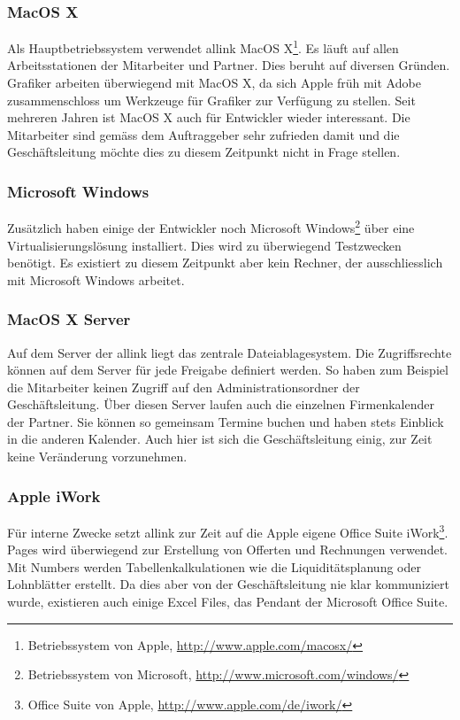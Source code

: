 \subsubsection{MacOS X}
Als Hauptbetriebssystem verwendet allink MacOS X\footnote{Betriebssystem von Apple, \url{http://www.apple.com/macosx/}}.
Es läuft auf allen Arbeitsstationen der Mitarbeiter und Partner. Dies beruht
auf diversen Gründen. Grafiker arbeiten überwiegend mit MacOS X, da sich Apple
früh mit Adobe zusammenschloss um Werkzeuge für Grafiker zur Verfügung zu stellen.
Seit mehreren Jahren ist MacOS X auch für Entwickler wieder interessant. Die 
Mitarbeiter sind gemäss dem Auftraggeber sehr zufrieden damit und die Geschäftsleitung 
möchte dies zu diesem Zeitpunkt nicht in Frage stellen.

\subsubsection{Microsoft Windows}
Zusätzlich haben einige der Entwickler noch Microsoft Windows\footnote{Betriebssystem von Microsoft, \url{http://www.microsoft.com/windows/}}
über eine Virtualisierungslösung installiert. Dies wird zu überwiegend Testzwecken 
benötigt. Es existiert zu diesem Zeitpunkt aber kein Rechner, der ausschliesslich
mit Microsoft Windows arbeitet.

\subsubsection{MacOS X Server}
Auf dem Server der allink liegt das zentrale Dateiablagesystem. Die Zugriffsrechte können
auf dem Server für jede Freigabe definiert werden. So haben zum Beispiel
die Mitarbeiter keinen Zugriff auf den Administrationsordner der Geschäftsleitung.
Über diesen Server laufen auch die einzelnen Firmenkalender der Partner. Sie
können so gemeinsam Termine buchen und haben stets Einblick in die anderen
Kalender. Auch hier ist sich die Geschäftsleitung einig, zur Zeit keine 
Veränderung vorzunehmen.

\subsubsection{Apple iWork}
Für interne Zwecke setzt allink zur Zeit auf die Apple eigene Office Suite iWork\footnote{Office Suite von Apple, \url{http://www.apple.com/de/iwork/}}.
Pages wird überwiegend zur Erstellung von Offerten und Rechnungen verwendet. Mit Numbers
werden Tabellenkalkulationen wie die Liquiditätsplanung oder Lohnblätter erstellt.
Da dies aber von der Geschäftsleitung nie klar kommuniziert wurde, existieren
auch einige Excel Files, das Pendant der Microsoft Office Suite.

